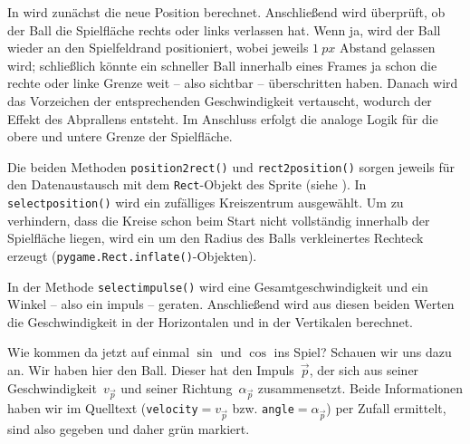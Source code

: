 
In  wird zunächst die neue Position berechnet. Anschließend wird überprüft, ob der Ball die Spielfläche rechts oder links verlassen hat. Wenn ja, wird der Ball wieder an den Spielfeldrand positioniert, wobei jeweils $1~px$ Abstand gelassen wird; schließlich könnte ein schneller Ball innerhalb eines Frames ja schon die rechte oder linke Grenze weit -- also sichtbar -- überschritten haben. Danach wird das Vorzeichen der entsprechenden Geschwindigkeit vertauscht, wodurch der Effekt des Abprallens entsteht. Im Anschluss erfolgt die analoge Logik für die obere und untere Grenze der Spielfläche.


Die beiden Methoden \texttt{position2rect()} und \texttt{rect2position()} sorgen jeweils für den Datenaustausch mit dem \texttt{Rect}-Objekt des Sprite (siehe ). In \texttt{select\-po\-si\-tion()} wird ein zufälliges Kreiszentrum ausgewählt. Um zu verhindern, dass die Kreise schon beim Start nicht vollständig innerhalb der Spielfläche liegen, wird ein um den Radius des Balls verkleinertes Rechteck erzeugt (\texttt{pygame.Rect.inflate()}-Objekten). 





In der Methode \texttt{selectimpulse()} wird eine Gesamtgeschwindigkeit und ein Winkel -- also ein \gls{impuls} -- geraten. Anschließend wird aus diesen beiden Werten die Geschwindigkeit in der Horizontalen und in der Vertikalen berechnet.

Wie kommen da jetzt auf einmal $\sin$ und $\cos$ ins Spiel? \randnotiz{$\sin()$, $\cos()$} Schauen wir uns dazu  an. Wir haben hier den Ball. Dieser hat den Impuls~\textcolor{green!70!black}{$\vec{p}$}, der sich aus seiner Geschwindigkeit~\textcolor{green!70!black}{$v_{\vec{p}}$} und seiner Richtung~\textcolor{green!70!black}{$\alpha_{\vec{p}}$} zusammensetzt. Beide Informationen haben wir im Quelltext (\texttt{velocity}\textcolor{green!70!black}{$=v_{\vec{p}}$} bzw. \texttt{angle}\textcolor{green!70!black}{$=\alpha_{\vec{p}}$}) per Zufall ermittelt, sind also gegeben und daher \textcolor{green!70!black}{grün} markiert.


